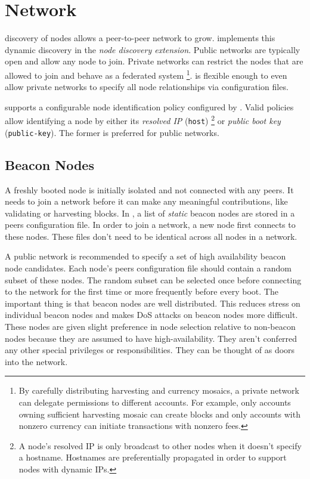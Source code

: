 \section{Network}
\label{sec:network}


 discovery of nodes allows a peer-to-peer network to grow.
\codenamespace implements this dynamic discovery in the \emph{node discovery extension}.
Public networks are typically open and allow any node to join.
Private networks can restrict the nodes that are allowed to join and behave as a federated system
\footnote{
	By carefully distributing harvesting and currency mosaics, a private network can delegate permissions to different accounts.
	For example, only accounts owning sufficient harvesting mosaic can create blocks and only accounts with nonzero currency can initiate transactions with nonzero fees.
}.
\codenamespace is flexible enough to even allow private networks to specify all node relationships via configuration files.

\codenamespace supports a configurable node identification policy configured by .
Valid policies allow identifying a node by either its \emph{resolved IP} (\texttt{host})
\footnote{
	A node's resolved IP is only broadcast to other nodes when it doesn't specify a hostname.
	Hostnames are preferentially propagated in order to support nodes with dynamic IPs.
} or \emph{public boot key} (\texttt{public-key}).
The former is preferred for public networks.

\subsection{Beacon Nodes}

A freshly booted node is initially isolated and not connected with any peers.
It needs to join a network before it can make any meaningful contributions, like validating or harvesting blocks.
In \codename, a list of \emph{static} beacon nodes are stored in a peers configuration file.
In order to join a network, a new node first connects to these nodes.
These files don't need to be identical across all nodes in a network.

A public network is recommended to specify a set of high availability beacon node candidates.
Each node's peers configuration file should contain a random subset of these nodes.
The random subset can be selected once before connecting to the network for the first time or more frequently before every boot.
The important thing is that beacon nodes are well distributed.
This reduces stress on individual beacon nodes and makes DoS attacks on beacon nodes more difficult.
These nodes are given slight preference in node selection  relative to non-beacon nodes because they are assumed to have high-availability.
They aren't conferred any other special privileges or responsibilities.
They can be thought of as doors into the network.

